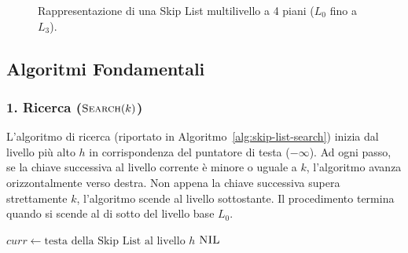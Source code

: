 \begin{figure}[htbp]
\caption{Rappresentazione di una Skip List multilivello a 4 piani ($L_0$ fino a $L_3$).}
\label{fig:multilevel-skip-list}
\end{figure}

\subsection{Algoritmi Fondamentali}

\subsubsection{1. Ricerca ($\textsc{Search}(k)$)}
L'algoritmo di ricerca (riportato in Algoritmo~\ref{alg:skip-list-search}) inizia dal livello più alto $h$ in corrispondenza del puntatore di testa ($-\infty$). Ad ogni passo, se la chiave successiva al livello corrente è minore o uguale a $k$, l'algoritmo avanza orizzontalmente verso destra. Non appena la chiave successiva supera strettamente $k$, l'algoritmo scende al livello sottostante. Il procedimento termina quando si scende al di sotto del livello base $L_0$.

\begin{algorithm}[htbp]
\caption{Ricerca in una Skip List ($\textsc{Search}(k)$)}
\label{alg:skip-list-search}

$curr \leftarrow \text{testa della Skip List al livello } h$\;
\Return $\textsc{NIL}$\;
\end{algorithm}

